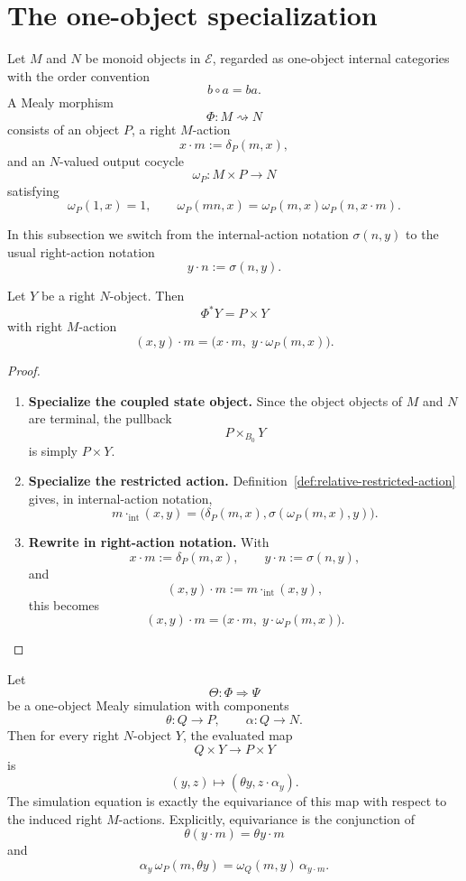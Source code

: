\section{The one-object specialization}
\label{sec:relative-one-object-specialization}

Let \(M\) and \(N\) be monoid objects in \(\mathcal E\), regarded as
one-object internal categories with the order convention
\[
b\circ a=ba.
\]
A Mealy morphism
\[
\Phi:M\rightsquigarrow N
\]
consists of an object \(P\), a right \(M\)-action
\[
x\cdot m:=\delta_P(m,x),
\]
and an \(N\)-valued output cocycle
\[
\omega_P:M\times P\to N
\]
satisfying
\[
\omega_P(1,x)=1,
\qquad
\omega_P(mn,x)=\omega_P(m,x)\omega_P(n,x\cdot m).
\]

In this subsection we switch from the internal-action notation
\(\sigma(n,y)\) to the usual right-action notation
\[
y\cdot n:=\sigma(n,y).
\]

\begin{proposition}
\label{prop:relative-one-object-cascade}
Let \(Y\) be a right \(N\)-object. Then
\[
\Phi^\ast Y=P\times Y
\]
with right \(M\)-action
\[
(x,y)\cdot m
=
\bigl(x\cdot m,\;y\cdot \omega_P(m,x)\bigr).
\]
\end{proposition}

\begin{proof}
\leavevmode
\begin{enumerate}
\item \textbf{Specialize the coupled state object.}
Since the object objects of \(M\) and \(N\) are terminal, the pullback
\[
P\times_{B_0}Y
\]
is simply \(P\times Y\).

\item \textbf{Specialize the restricted action.}
Definition~\ref{def:relative-restricted-action} gives, in internal-action
notation,
\[
m\cdot_{\mathrm{int}}(x,y)
=
\bigl(\delta_P(m,x),\sigma(\omega_P(m,x),y)\bigr).
\]

\item \textbf{Rewrite in right-action notation.}
With
\[
x\cdot m:=\delta_P(m,x),
\qquad
y\cdot n:=\sigma(n,y),
\]
and
\[
(x,y)\cdot m:=m\cdot_{\mathrm{int}}(x,y),
\]
this becomes
\[
(x,y)\cdot m
=
\bigl(x\cdot m,\;y\cdot \omega_P(m,x)\bigr).
\]
\end{enumerate}
\end{proof}

\begin{proposition}
\label{prop:relative-one-object-simulation-evaluation}
Let
\[
\Theta:\Phi\Rightarrow\Psi
\]
be a one-object Mealy simulation with components
\[
\theta:Q\to P,
\qquad
\alpha:Q\to N.
\]
Then for every right \(N\)-object \(Y\), the evaluated map
\[
Q\times Y\to P\times Y
\]
is
\[
(y,z)\longmapsto(\theta y,z\cdot\alpha_y).
\]
The simulation equation is exactly the equivariance of this map with respect
to the induced right \(M\)-actions. Explicitly, equivariance is the conjunction
of
\[
\theta(y\cdot m)=\theta y\cdot m
\]
and
\[
\alpha_y\,\omega_P(m,\theta y)
=
\omega_Q(m,y)\,\alpha_{y\cdot m}.
\]
\end{proposition}

